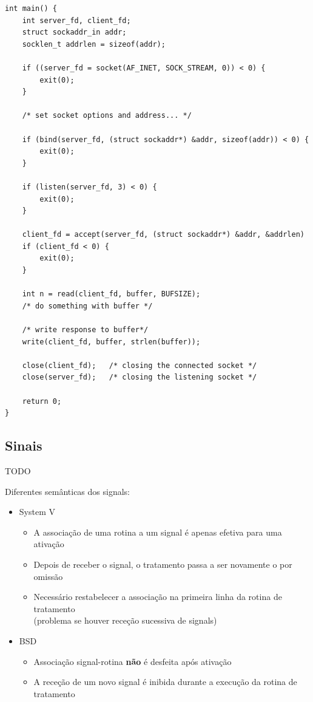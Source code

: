 \documentclass[11pt]{article}
\begin{document}
\begin{lstlisting}
int main() {
    int server_fd, client_fd;
    struct sockaddr_in addr;
    socklen_t addrlen = sizeof(addr);
    
    if ((server_fd = socket(AF_INET, SOCK_STREAM, 0)) < 0) {
        exit(0);
    }
    
    /* set socket options and address... */
    
    if (bind(server_fd, (struct sockaddr*) &addr, sizeof(addr)) < 0) {
        exit(0);
    }

    if (listen(server_fd, 3) < 0) {
        exit(0);
    }

    client_fd = accept(server_fd, (struct sockaddr*) &addr, &addrlen)
    if (client_fd < 0) {
        exit(0);
    }

    int n = read(client_fd, buffer, BUFSIZE);
    /* do something with buffer */

    /* write response to buffer*/
    write(client_fd, buffer, strlen(buffer));
    
    close(client_fd);   /* closing the connected socket */
    close(server_fd);   /* closing the listening socket */

    return 0;
}
\end{lstlisting}

\subsection{Sinais}

TODO

Diferentes semânticas dos signals:
\begin{itemize}
    \item System V
          \begin{itemize}
              \item A associação de uma rotina a um signal é apenas efetiva para uma ativação
              \item Depois de receber o signal, o tratamento passa a ser novamente o por omissão
              \item Necessário restabelecer a associação na primeira linha da rotina de tratamento \\
                    (problema se houver receção sucessiva de signals)
          \end{itemize}
    \item BSD
          \begin{itemize}
              \item Associação signal-rotina \textbf{não} é desfeita após ativação
              \item A receção de um novo signal é inibida durante a execução da rotina de tratamento
          \end{itemize}
\end{itemize}
\end{document}
